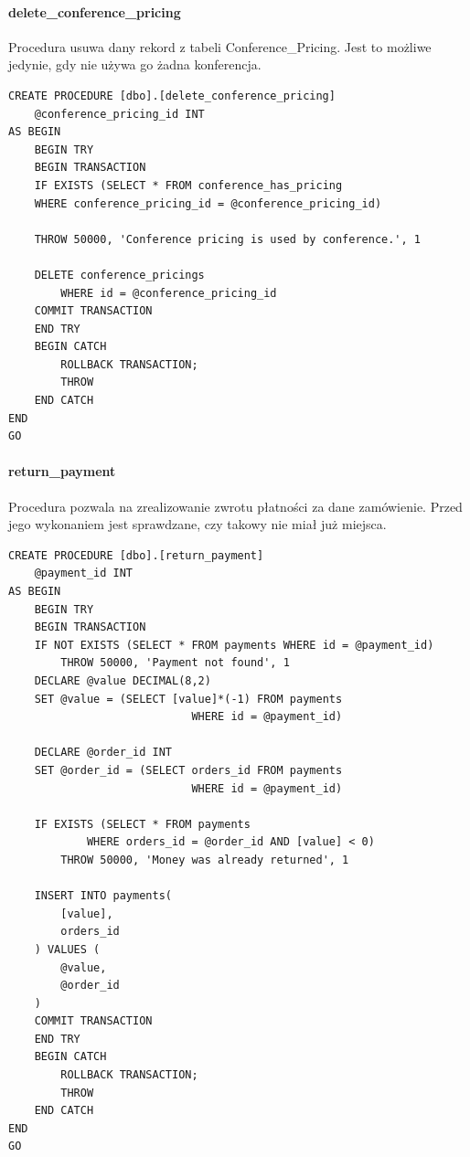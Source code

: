 \documentclass[12pt]{article}
\begin{document}
\paragraph{delete\_conference\_pricing \\}
Procedura usuwa dany rekord z tabeli Conference\_Pricing. Jest to możliwe jedynie, gdy nie używa go żadna konferencja.\\
\begin{lstlisting}
CREATE PROCEDURE [dbo].[delete_conference_pricing]
	@conference_pricing_id INT
AS BEGIN
	BEGIN TRY
	BEGIN TRANSACTION
	IF EXISTS (SELECT * FROM conference_has_pricing
    WHERE conference_pricing_id = @conference_pricing_id)

    THROW 50000, 'Conference pricing is used by conference.', 1

	DELETE conference_pricings
		WHERE id = @conference_pricing_id
	COMMIT TRANSACTION
	END TRY
	BEGIN CATCH
		ROLLBACK TRANSACTION;
		THROW
	END CATCH
END
GO
\end{lstlisting}
\newpage

\paragraph{return\_payment \\}
Procedura pozwala na zrealizowanie zwrotu płatności za dane zamówienie. Przed jego wykonaniem jest sprawdzane, czy takowy nie miał już miejsca. \\
\begin{lstlisting}
CREATE PROCEDURE [dbo].[return_payment]
	@payment_id INT
AS BEGIN
	BEGIN TRY
	BEGIN TRANSACTION
	IF NOT EXISTS (SELECT * FROM payments WHERE id = @payment_id)
		THROW 50000, 'Payment not found', 1
	DECLARE @value DECIMAL(8,2)
	SET @value = (SELECT [value]*(-1) FROM payments
    						WHERE id = @payment_id)

	DECLARE @order_id INT
	SET @order_id = (SELECT orders_id FROM payments
    						WHERE id = @payment_id)

	IF EXISTS (SELECT * FROM payments
    		WHERE orders_id = @order_id AND [value] < 0)
		THROW 50000, 'Money was already returned', 1

	INSERT INTO payments(
		[value],
		orders_id
	) VALUES (
		@value,
		@order_id
	)
	COMMIT TRANSACTION
	END TRY
	BEGIN CATCH
		ROLLBACK TRANSACTION;
		THROW
	END CATCH
END
GO
\end{lstlisting}
\newpage
\end{document}
